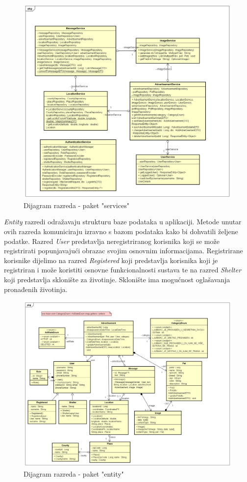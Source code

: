 			\begin{figure}[htb]
				\centering
				\includegraphics[width=\textwidth]{slike/dr2_servisi.png}
				\caption{Dijagram razreda - paket "services"}
			\end{figure}
			\pagebreak

                \textit{Entity} razredi odražavaju strukturu baze podataka u aplikaciji. Metode unutar ovih razreda komuniciraju izravno s bazom podataka kako bi dohvatili željene podatke. Razred \textit{User} predstavlja neregistriranog korisnika koji se može registrirati popunjavajući obrazac svojim osnovnim informacijama. Registrirane korisnike dijelimo na razred \textit{Registered} koji predstavlja korisnika koji je registriran i može koristiti osnovne funkcionalnosti sustava te na razred \textit{Shelter} koji predstavlja sklonište za životinje. Sklonište ima mogućnost oglašavanja pronađenih životinja.
   
			\begin{figure}[htb]
				\centering
				\includegraphics[width=\textwidth]{slike/dr3_entiteti.png}
				\caption{Dijagram razreda - paket "entity"}
			\end{figure}
			\pagebreak
			
